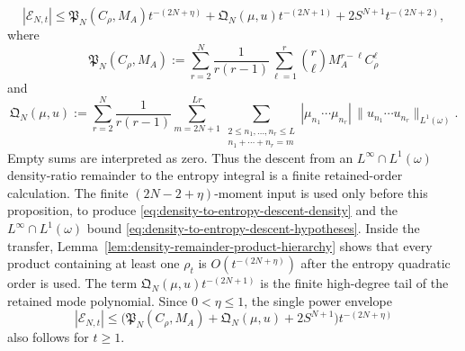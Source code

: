 \begin{proposition}
\begin{equation}\label{eq:density-to-entropy-descent-remainder}
|\mathcal E_{N,t}|
\le
\mathfrak P_N(C_\rho,M_A)t^{-(2N+\eta)}
+\mathfrak Q_N(\mu,u)t^{-(2N+1)}
+2S^{N+1}t^{-(2N+2)},
\end{equation}
where
\begin{equation}\label{eq:entropy-constant-product-error}
\mathfrak P_N(C_\rho,M_A)
:=
\sum_{r=2}^{N}\frac{1}{r(r-1)}
\sum_{\ell=1}^{r}\binom r\ell M_A^{r-\ell}C_\rho^\ell
\end{equation}
and
\begin{equation}\label{eq:entropy-constant-truncation-error}
\mathfrak Q_N(\mu,u)
:=
\sum_{r=2}^{N}\frac{1}{r(r-1)}
\sum_{m=2N+1}^{Lr}
\sum_{\substack{2\le n_1,\ldots,n_r\le L\\
n_1+\cdots+n_r=m}}
|\mu_{n_1}\cdots\mu_{n_r}|\,
\|u_{n_1}\cdots u_{n_r}\|_{L^1(\omega)} .
\end{equation}
Empty sums are interpreted as zero.
Thus the descent from an $L^\infty\cap L^1(\omega)$ density-ratio remainder to
the entropy integral is a finite retained-order calculation.  The finite
\((2N-2+\eta)\)-moment input is used only before this proposition, to produce
\eqref{eq:density-to-entropy-descent-density} and the
$L^\infty\cap L^1(\omega)$ bound
\eqref{eq:density-to-entropy-descent-hypotheses}.  Inside the transfer,
Lemma~\ref{lem:density-remainder-product-hierarchy} shows that every product
containing at least one $\rho_t$ is \(O(t^{-(2N+\eta)})\) after the
entropy quadratic order is used.  The term
$\mathfrak Q_N(\mu,u)t^{-(2N+1)}$ is the finite high-degree tail of the
retained mode polynomial.  Since \(0<\eta\le1\), the single power envelope
\begin{equation}\label{eq:density-to-entropy-convenience-envelope}
|\mathcal E_{N,t}|
\le
\bigl(\mathfrak P_N(C_\rho,M_A)+\mathfrak Q_N(\mu,u)
+2S^{N+1}\bigr)t^{-(2N+\eta)}
\end{equation}
also follows for $t\ge1$.


\end{proposition}
